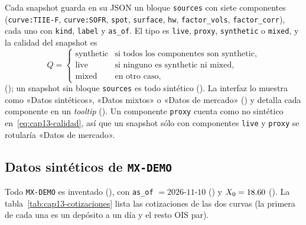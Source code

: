\begin{sloppypar}
Cada snapshot guarda en su JSON un bloque \texttt{sources} con siete componentes (\texttt{curve:TIIE-F},
\texttt{curve:SOFR}, \texttt{spot}, \texttt{surface}, \texttt{hw}, \texttt{factor\_vols},
\texttt{factor\_corr}), cada uno con \texttt{kind}, \texttt{label} y \texttt{as\_of}. El tipo es
\texttt{live}, \texttt{proxy}, \texttt{synthetic} o \texttt{mixed}, y la calidad del snapshot es
\begin{equation}\label{eq:cap13-calidad}
  Q=\begin{cases}
    \text{synthetic} & \text{si todos los componentes son synthetic},\\
    \text{live} & \text{si ninguno es synthetic ni mixed},\\
    \text{mixed} & \text{en otro caso},
  \end{cases}
\end{equation}
(); un snapshot sin bloque \texttt{sources} es todo sintético
(). La interfaz lo muestra como «Datos sintéticos», «Datos mixtos» o «Datos
de mercado» () y detalla cada componente en un
\emph{tooltip} (). Un componente \texttt{proxy} cuenta como no
sintético en~\eqref{eq:cap13-calidad}, así que un snapshot sólo con componentes \texttt{live} y \texttt{proxy}
se rotularía «Datos de mercado».

\subsection{Datos sintéticos de \texttt{MX-DEMO}}\label{sec:cap13-sinteticos}

Todo \texttt{MX-DEMO} es inventado (), con
\texttt{as\_of} $=2026\text{-}11\text{-}10$ () y
$X_0=18.60$ (). La tabla~\ref{tab:cap13-cotizaciones} lista las
cotizaciones de las dos curvas (la primera de cada una es un depósito a un día y el resto OIS par).


\end{sloppypar}
